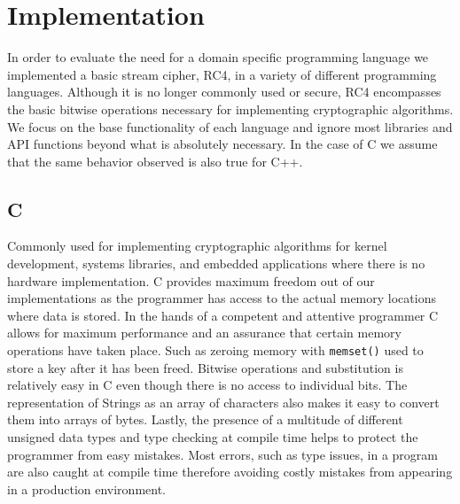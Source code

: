 \section{Implementation}
In order to evaluate the need for a domain specific programming language we implemented a basic stream cipher, RC4, 
in a variety of different programming languages. Although it is no longer commonly used or secure, RC4 encompasses 
the basic bitwise operations necessary for implementing cryptographic algorithms. We focus on the base functionality 
of each language and ignore most libraries and API functions beyond what is absolutely necessary. In the case of C we 
assume that the same behavior observed is also true for C++.

\subsection{C}
Commonly used for implementing cryptographic algorithms for kernel development, systems libraries, and embedded applications 
where there is no hardware implementation. C provides maximum freedom out of our implementations as the programmer has access 
to the actual memory locations where data is stored. In the hands of a competent and attentive programmer C allows for maximum 
performance and an assurance that certain memory operations have taken place. Such as zeroing memory with \texttt{memset()} used to store a key after 
it has been freed. Bitwise operations and substitution is relatively easy in C even though there is no access to individual bits. The representation of 
Strings as an array of characters also makes it easy to convert them into arrays of bytes. Lastly, the presence of a multitude of different unsigned 
data types and type checking at compile time helps to protect the programmer from easy mistakes. Most errors, such as type issues, in a program are 
also caught at compile time therefore avoiding costly mistakes from appearing in a production environment.

